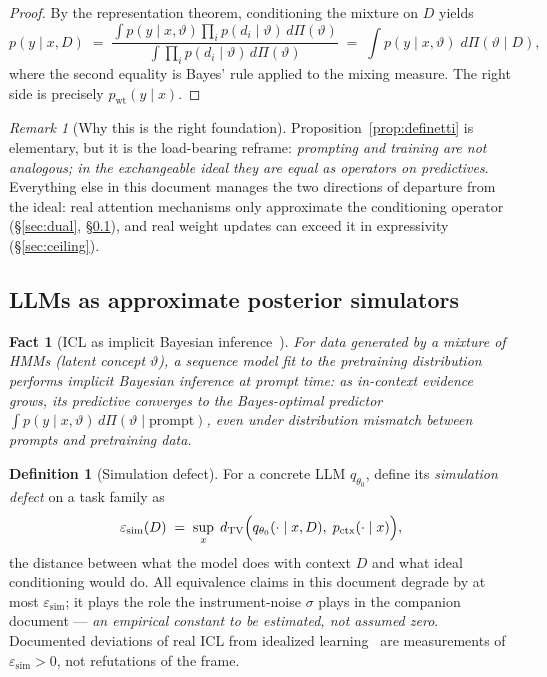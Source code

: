 \documentclass[11pt]{article}
\theoremstyle{plain}
\newtheorem{fact}[theorem]{Fact}            %
\theoremstyle{definition}
\newtheorem{definition}[theorem]{Definition}
\theoremstyle{remark}
\newtheorem{remark}[theorem]{Remark}
\newcommand{\post}{\Pi}
\begin{document}
\begin{proof}
By the representation theorem, conditioning the mixture on $D$ yields
\[
  p(y \mid x, D)
  \;=\; \frac{\int p(y \mid x, \vartheta) \prod_i p(d_i \mid \vartheta)\,
  d\post(\vartheta)}{\int \prod_i p(d_i \mid \vartheta)\, d\post(\vartheta)}
  \;=\; \int p(y \mid x, \vartheta)\; d\post(\vartheta \mid D),
\]
where the second equality is Bayes' rule applied to the mixing measure. The
right side is precisely $p_{\mathrm{wt}}(y \mid x)$.
\end{proof}

\begin{remark}[Why this is the right foundation]
Proposition~\ref{prop:definetti} is elementary, but it is the load-bearing
reframe: \emph{prompting and training are not analogous; in the exchangeable
ideal they are equal as operators on predictives}. Everything else in this
document manages the two directions of departure from the ideal: real
attention mechanisms only approximate the conditioning operator
(\S\ref{sec:dual}, \S\ref{sec:defect}), and real weight updates can exceed
it in expressivity (\S\ref{sec:ceiling}).
\end{remark}

\subsection{LLMs as approximate posterior simulators}\label{sec:defect}

\begin{fact}[ICL as implicit Bayesian inference~\cite{xie}]\label{fact:xie}
For data generated by a mixture of HMMs (latent concept $\vartheta$),
a sequence model fit to the pretraining distribution performs implicit
Bayesian inference at prompt time: as in-context evidence grows, its
predictive converges to the Bayes-optimal predictor
$\int p(y \mid x, \vartheta)\, d\post(\vartheta \mid \mathrm{prompt})$,
even under distribution mismatch between prompts and pretraining data.
\end{fact}

\begin{definition}[Simulation defect]\label{def:defect}
For a concrete LLM $q_{\theta_0}$, define its \emph{simulation defect} on a
task family as
\[
  \varepsilon_{\mathrm{sim}}(D)
  \;=\; \sup_{x}\;
  d_{\mathrm{TV}}\Bigl( q_{\theta_0}(\cdot \mid x, D),\;
  p_{\mathrm{ctx}}(\cdot \mid x) \Bigr),
\]
the distance between what the model does with context $D$ and what ideal
conditioning would do. All equivalence claims in this document degrade by at
most $\varepsilon_{\mathrm{sim}}$; it plays the role the instrument-noise
$\sigma$ plays in the companion document --- \emph{an empirical constant to
be estimated, not assumed zero}. Documented deviations of real ICL from
idealized learning~\cite{shen} are measurements of
$\varepsilon_{\mathrm{sim}} > 0$, not refutations of the frame.
\end{definition}
\end{document}
